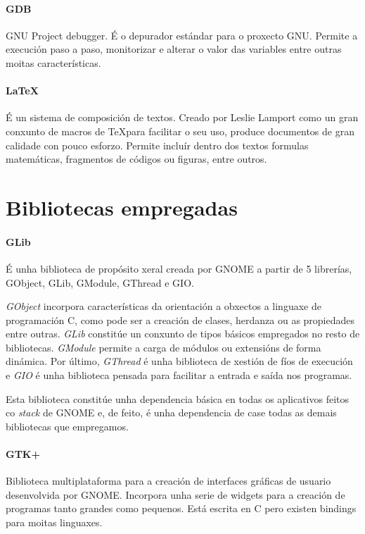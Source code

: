 \paragraph{GDB} GNU Project debugger. É o depurador estándar para o proxecto GNU. Permite a execución paso a paso, monitorizar e alterar o valor das variables entre outras moitas características.

\paragraph{\LaTeX} É un sistema de composición de textos. Creado por Leslie Lamport como un gran conxunto de macros de \TeX para facilitar o seu uso, produce documentos de gran calidade con pouco esforzo. Permite incluír dentro dos textos formulas matemáticas, fragmentos de códigos ou figuras, entre outros.

\section{Bibliotecas empregadas}

\paragraph{GLib} É unha biblioteca de propósito xeral creada por GNOME a partir de 5 librerías, GObject, GLib, GModule, GThread e GIO.

\emph{GObject} incorpora características da orientación a obxectos a linguaxe de programación C, como pode ser a creación de clases, herdanza ou as propiedades entre outras. \emph{GLib} constitúe un conxunto de tipos básicos empregados no resto de bibliotecas. \emph{GModule} permite a carga de módulos ou extensións de forma dinámica. Por último, \emph{GThread} é unha biblioteca de xestión de fíos de execución e \emph{GIO} é unha biblioteca pensada para facilitar a entrada e saída nos programas.

Esta biblioteca constitúe unha dependencia básica en todas os aplicativos feitos co \emph{stack} de GNOME e, de feito, é unha dependencia de case todas as demais bibliotecas que empregamos.

\paragraph{GTK+} Biblioteca multiplataforma para a creación de interfaces gráficas de usuario desenvolvida por GNOME. Incorpora unha serie de widgets para a creación de programas tanto grandes como pequenos. Está escrita en C pero existen bindings para moitas linguaxes.

